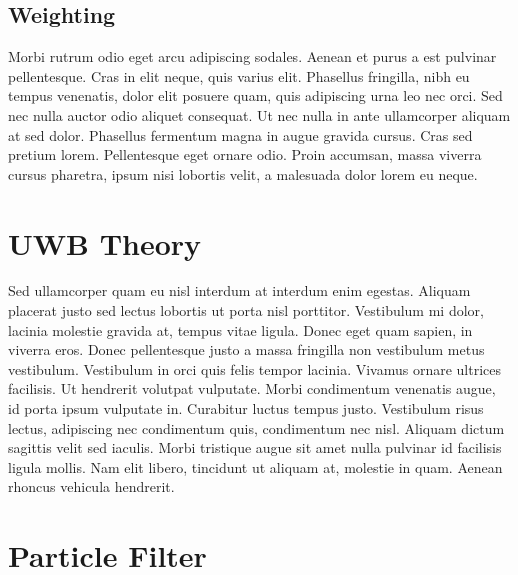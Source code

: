 
\subsection{Weighting}
Morbi rutrum odio eget arcu adipiscing sodales. Aenean et purus a est pulvinar pellentesque. Cras in elit neque, quis varius elit. Phasellus fringilla, nibh eu tempus venenatis, dolor elit posuere quam, quis adipiscing urna leo nec orci. Sed nec nulla auctor odio aliquet consequat. Ut nec nulla in ante ullamcorper aliquam at sed dolor. Phasellus fermentum magna in augue gravida cursus. Cras sed pretium lorem. Pellentesque eget ornare odio. Proin accumsan, massa viverra cursus pharetra, ipsum nisi lobortis velit, a malesuada dolor lorem eu neque.


\section{UWB Theory}

Sed ullamcorper quam eu nisl interdum at interdum enim egestas. Aliquam placerat justo sed lectus lobortis ut porta nisl porttitor. Vestibulum mi dolor, lacinia molestie gravida at, tempus vitae ligula. Donec eget quam sapien, in viverra eros. Donec pellentesque justo a massa fringilla non vestibulum metus vestibulum. Vestibulum in orci quis felis tempor lacinia. Vivamus ornare ultrices facilisis. Ut hendrerit volutpat vulputate. Morbi condimentum venenatis augue, id porta ipsum vulputate in. Curabitur luctus tempus justo. Vestibulum risus lectus, adipiscing nec condimentum quis, condimentum nec nisl. Aliquam dictum sagittis velit sed iaculis. Morbi tristique augue sit amet nulla pulvinar id facilisis ligula mollis. Nam elit libero, tincidunt ut aliquam at, molestie in quam. Aenean rhoncus vehicula hendrerit.


\section{Particle Filter}

